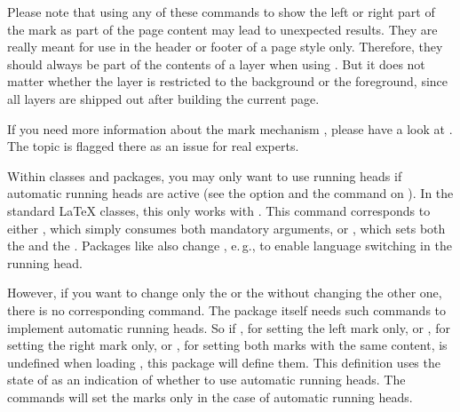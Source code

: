   Please note that using any of these commands to show
  the left or right part of the mark as part of the page content may lead to
  unexpected results. They are really meant for use in the header or footer 
  of a page style only. Therefore, they should always be part of the contents
  of a layer when using . But it does not matter whether the layer is restricted to the background
  or the foreground, since all layers are shipped out after building the
  current page.

  If you need more information about the mark mechanism 
  , please have a look at 
  \cite[chapter~23]{knuth:texbook}. The topic is flagged there as an issue for
  real experts. %
  \EndIndexGroup


  \begin{Declaration}
  \end{Declaration}
  Within classes and packages, you may only want to use running heads if
  automatic running heads are active (see the
   option and the
   command on
  ). In the standard \LaTeX{}
  classes, this only works with . This command corresponds to
  either , which simply consumes both mandatory arguments, 
  or , which sets both the  
  and the . Packages like  also change 
  \Macro{\@mkboth}, e.\,g., to enable language switching in the running head.

  However, if you want to change only the  or the 
   without changing the other one, there is no corresponding
  command. The  package itself needs such commands to implement automatic running heads.
  So if , for setting the left mark only, or ,
  for setting the right mark only, or , for setting both
  marks with the same content, is undefined when loading 
  , this package will define them. This definition uses the state of
   as an indication of whether to use automatic running heads.
  The commands will set the marks only in the case of automatic running heads.

